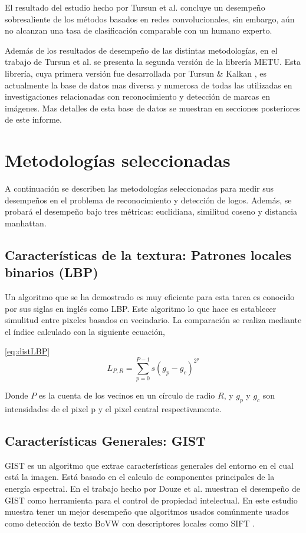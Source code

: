 \documentclass[conference]{IEEEtran}
\begin{document}
El resultado del estudio hecho por Tursun et al. \cite{metuV2} concluye un desempeño sobresaliente de los métodos basados en redes convolucionales, sin embargo, aún no alcanzan una tasa de clasificación comparable con un humano experto. 

Además de los resultados de desempeño de las distintas metodologías, en el trabajo de Tursun et al. \cite{metuV2} se presenta la segunda versión de la librería METU. Esta librería, cuya primera versión fue desarrollada por Tursun \& Kalkan \cite{metuV1}, es actualmente la base de datos mas diversa y numerosa de todas las utilizadas en investigaciones relacionadas con reconocimiento y detección de marcas en imágenes. Mas detalles de esta base de datos se muestran en secciones posteriores de este informe. 


\section{Metodologías seleccionadas}
A continuación se describen las metodologías seleccionadas para medir sus desempeños en el problema de reconocimiento y detección de logos. Además, se probará el desempeño bajo tres métricas: euclidiana, similitud coseno y distancia manhattan.

\subsection{Caracter\'isticas de la textura: Patrones locales binarios (LBP)}

Un algoritmo que se ha demostrado es muy eficiente para esta tarea es conocido por sus siglas en inglés como LBP\cite{LBP}. Este algoritmo lo que hace es establecer simulitud entre pixeles basados en vecindario. La comparación se realiza mediante el índice calculado con la siguiente ecuación,

\ref{eq:distLBP} 
	\begin{equation}
	L_{P,R} = \sum_{p=0}^{P-1} s{(g_p - g_c)}^{{2}^p}
	\label{eq:distLBP}
\end{equation}

Donde $P$ es la cuenta de los vecinos en un círculo de radio $R$, y $g_p$ y $g_c$ son intensidades de el pixel p y el pixel central respectivamente.

\subsection{Características Generales: GIST}
GIST es un algoritmo que extrae características generales del entorno en el cual está la imagen. Está basado en el calculo de componentes principales de la energía espectral. En el trabajo hecho por Douze et al. \cite{GIST} muestran el desempeño de GIST como herramienta para el control de propiedad intelectual. En este estudio muestra tener un mejor desempeño que algoritmos usados comúnmente usados como detección de texto BoVW \cite{bowd} con descriptores locales como SIFT \cite{kpoint}.
\end{document}

